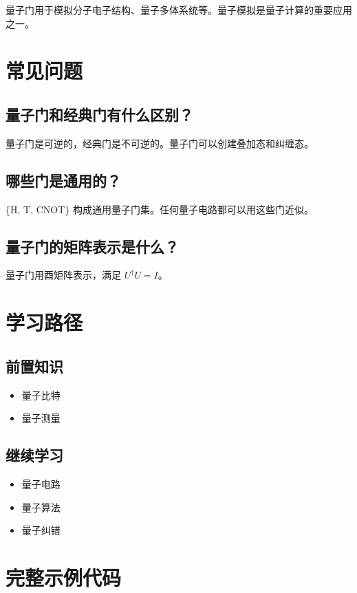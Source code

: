 \documentclass[12pt,a4paper]{article}
\begin{document}
量子门用于模拟分子电子结构、量子多体系统等。量子模拟是量子计算的重要应用之一。

\section{常见问题}

\subsection{量子门和经典门有什么区别？}

量子门是可逆的，经典门是不可逆的。量子门可以创建叠加态和纠缠态。

\subsection{哪些门是通用的？}

\{H, T, CNOT\} 构成通用量子门集。任何量子电路都可以用这些门近似。

\subsection{量子门的矩阵表示是什么？}

量子门用酉矩阵表示，满足 $U^\dagger U = I$。

\section{学习路径}

\subsection{前置知识}
\begin{itemize}
  \item 量子比特
  \item 量子测量
\end{itemize}

\subsection{继续学习}
\begin{itemize}
  \item 量子电路
  \item 量子算法
  \item 量子纠错
\end{itemize}

\section{完整示例代码}
\end{document}
